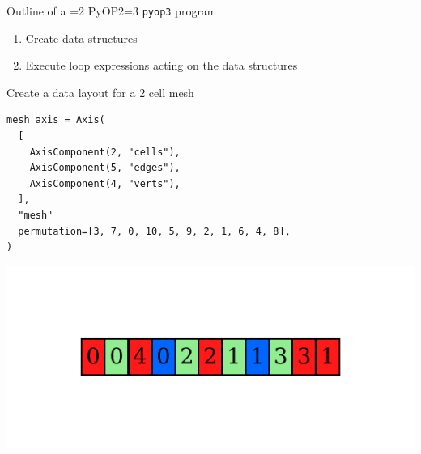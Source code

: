 \documentclass[aspectratio=169]{beamer}
\def\pyop#1{\ifnum#1=2 {PyOP2}\else \ifnum#1=3 {\texttt{pyop3}}\fi \fi}
\begin{document}
\begin{frame}{Outline of a \pyop3 program}
  \begin{enumerate}
    \item Create data structures
    \item Execute loop expressions acting on the data structures
  \end{enumerate}
\end{frame}

\begin{frame}[fragile]{Create a data layout for a 2 cell mesh}
  \noindent
  \begin{minipage}{.4\textwidth}
    \begin{tikzpicture}[scale=.9]
      
    \end{tikzpicture}
  \end{minipage}%
  \begin{minipage}{.55\textwidth}
    \begin{tcolorbox}
      \begin{verbatim}
mesh_axis = Axis(
  [
    AxisComponent(2, "cells"),
    AxisComponent(5, "edges"),
    AxisComponent(4, "verts"),
  ],
  "mesh"
  permutation=[3, 7, 0, 10, 5, 9, 2, 1, 6, 4, 8],
)
      \end{verbatim}
    \end{tcolorbox}
  \end{minipage}

  \pause
  \vspace{-2em}

  \begin{center}
    \includegraphics{scripts/two_cell_mesh.gv.pdf}
  \end{center}
\end{frame}
\end{document}
